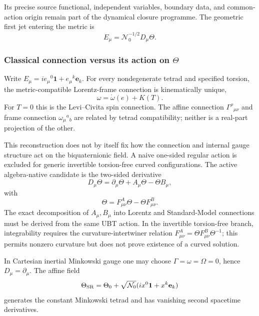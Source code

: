 Its precise source functional, independent variables, boundary data, and
common-action origin remain part of the dynamical closure programme.  The
geometric first jet entering the metric is
\begin{equation}
 E_\mu=\mathcal N_0^{-1/2}D_\mu\Theta.
\end{equation}

\subsubsection{Classical connection versus its action on $\Theta$}

Write $E_\mu=i e_\mu{}^0\mathbf1+e_\mu{}^k\mathbf e_k$.  For every
nondegenerate tetrad and specified torsion, the metric-compatible Lorentz-frame
connection is kinematically unique,
\begin{equation}
 \omega=\mathring\omega(e)+K(T).
\end{equation}
For $T=0$ this is the Levi--Civita spin connection.  The affine connection
$\Gamma^\rho{}_{\mu\nu}$ and frame connection $\omega_\mu{}^a{}_b$ are related
by tetrad compatibility; neither is a real-part projection of the other.

This reconstruction does not by itself fix how the connection and internal
gauge structure act on the biquaternionic field.  A naive one-sided regular
action is excluded for generic invertible torsion-free curved configurations.
The active algebra-native candidate is the two-sided derivative
\begin{equation}
\label{eq:canonical:nabla_structure}
 \boxed{D_\mu\Theta=\partial_\mu\Theta+A_\mu\Theta-\Theta B_\mu,}
\end{equation}
with
\begin{equation}
 [D_\mu,D_\nu]\Theta
 =F^A_{\mu\nu}\Theta-\Theta F^B_{\mu\nu}.
\end{equation}
The exact decomposition of $A_\mu,B_\mu$ into Lorentz and Standard-Model
connections must be derived from the same UBT action.  In the invertible
 torsion-free branch, integrability requires the curvature-intertwiner relation
$F^A_{\mu\nu}=\Theta F^B_{\mu\nu}\Theta^{-1}$; this permits nonzero curvature
but does not prove existence of a curved solution.

In Cartesian inertial Minkowski gauge one may choose
$\Gamma=\omega=\Omega=0$, hence $D_\mu=\partial_\mu$.  The affine field
\begin{equation}
 \Theta_{\rm SR}=\Theta_0+\sqrt{\mathcal N_0}
 (ix^0\mathbf1+x^k\mathbf e_k)
\end{equation}
generates the constant Minkowski tetrad and has vanishing second spacetime
derivatives.


